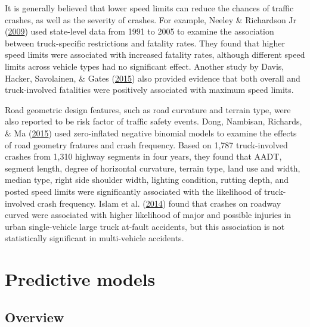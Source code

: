 \documentclass[12pt]{book}
\numberwithin{equation}{chapter}
\begin{document}
It is generally believed that lower speed limits can reduce the chances of traffic crashes, as well as the severity of crashes. For example, Neeley \& Richardson Jr (\protect\hyperlink{ref-neeley2009effect}{2009}) used state-level data from 1991 to 2005 to examine the association between truck-specific restrictions and fatality rates. They found that higher speed limits were associated with increased fatality rates, although different speed limits across vehicle types had no significant effect. Another study by Davis, Hacker, Savolainen, \& Gates (\protect\hyperlink{ref-davis2015longitudinal}{2015}) also provided evidence that both overall and truck-involved fatalities were positively associated with maximum speed limits.

Road geometric design features, such as road curvature and terrain type, were also reported to be risk factor of traffic safety events. Dong, Nambisan, Richards, \& Ma (\protect\hyperlink{ref-dong2015assessment}{2015}) used zero-inflated negative binomial models to examine the effects of road geometry fratures and crash frequency. Based on 1,787 truck-involved crashes from 1,310 highway segments in four years, they found that AADT, segment length, degree of horizontal curvature, terrain type, land use and width, median type, right side shoulder width, lighting condition, rutting depth, and posted speed limits were significantly associated with the likelihood of truck-involved crash frequency. Islam et al. (\protect\hyperlink{ref-islam2014comprehensive}{2014}) found that crashes on roadway curved were associated with higher likelihood of major and possible injuries in urban single-vehicle large truck at-fault accidents, but this association is not statistically significant in multi-vehicle accidents.

\hypertarget{predictive-models}{%
\section{Predictive models}\label{predictive-models}}

\hypertarget{overview}{%
\subsection{Overview}\label{overview}}
\end{document}
